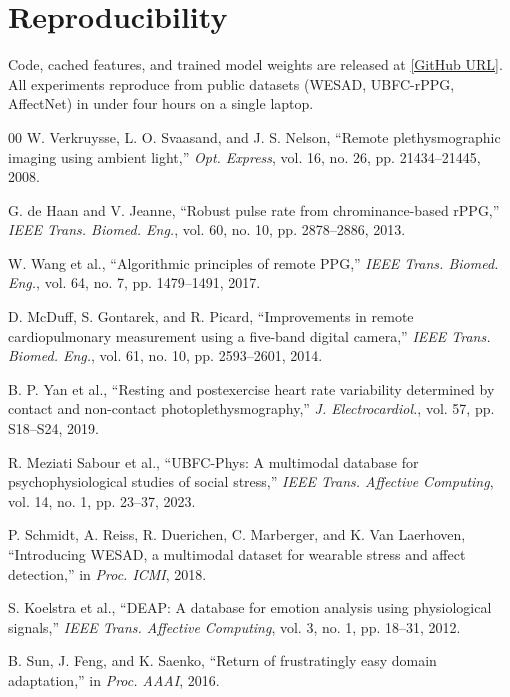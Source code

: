 \documentclass[conference]{IEEEtran}
\begin{document}
\section*{Reproducibility}

Code, cached features, and trained model weights are released at
\url{[GitHub URL]}. All experiments reproduce from public datasets
(WESAD, UBFC-rPPG, AffectNet) in under four hours on a single laptop.

\begin{thebibliography}{00}
 W. Verkruysse, L. O. Svaasand, and J. S. Nelson,
``Remote plethysmographic imaging using ambient light,''
\emph{Opt. Express}, vol. 16, no. 26, pp. 21434--21445, 2008.

 G. de Haan and V. Jeanne, ``Robust pulse rate
from chrominance-based rPPG,'' \emph{IEEE Trans. Biomed. Eng.},
vol. 60, no. 10, pp. 2878--2886, 2013.

 W. Wang et al., ``Algorithmic principles of remote
PPG,'' \emph{IEEE Trans. Biomed. Eng.}, vol. 64, no. 7,
pp. 1479--1491, 2017.

 D. McDuff, S. Gontarek, and R. Picard,
``Improvements in remote cardiopulmonary measurement using a
five-band digital camera,'' \emph{IEEE Trans. Biomed. Eng.},
vol. 61, no. 10, pp. 2593--2601, 2014.

 B. P. Yan et al., ``Resting and postexercise heart
rate variability determined by contact and non-contact
photoplethysmography,'' \emph{J. Electrocardiol.}, vol. 57,
pp. S18--S24, 2019.

 R. Meziati Sabour et al., ``UBFC-Phys: A
multimodal database for psychophysiological studies of social
stress,'' \emph{IEEE Trans. Affective Computing}, vol. 14, no. 1,
pp. 23--37, 2023.

 P. Schmidt, A. Reiss, R. Duerichen, C. Marberger,
and K. Van Laerhoven, ``Introducing WESAD, a multimodal dataset for
wearable stress and affect detection,'' in \emph{Proc. ICMI}, 2018.

 S. Koelstra et al., ``DEAP: A database for
emotion analysis using physiological signals,''
\emph{IEEE Trans. Affective Computing}, vol. 3, no. 1, pp. 18--31,
2012.

 B. Sun, J. Feng, and K. Saenko, ``Return of
frustratingly easy domain adaptation,'' in \emph{Proc. AAAI}, 2016.


\end{thebibliography}
\end{document}

